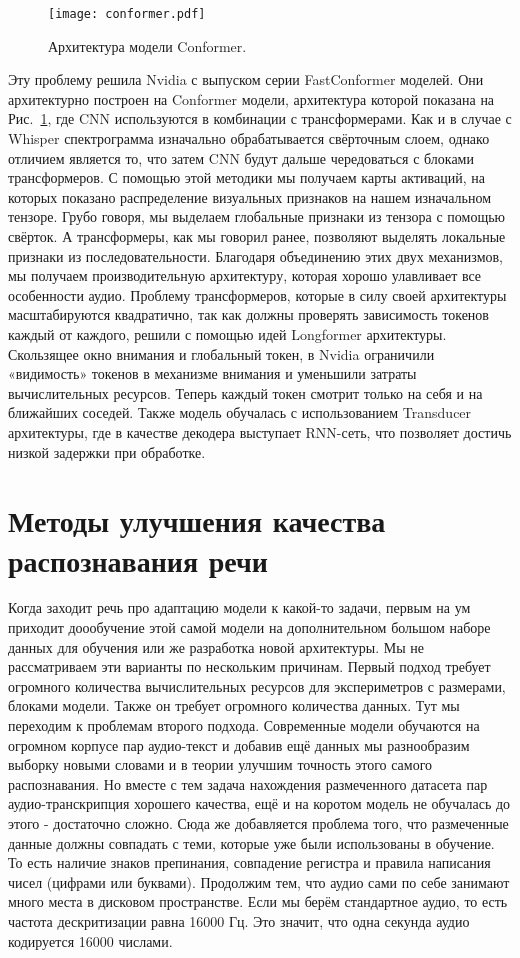 \begin{figure}[!t]
  \centering
  \texttt{[image: conformer.pdf]}
  \caption{Архитектура модели Conformer.}
  \label{fig:conformer}
\end{figure}

Эту проблему решила Nvidia с выпуском серии FastConformer моделей. 
Они архитектурно построен на Conformer модели, архитектура которой показана на Рис.~\ref{fig:conformer}, где CNN используются в комбинации с трансформерами.
Как и в случае с Whisper спектрограмма изначально обрабатывается свёрточным слоем, однако отличием является то, что затем CNN будут дальше чередоваться с блоками трансформеров.
С помощью этой методики мы получаем карты активаций, на которых показано распределение визуальных признаков на нашем изначальном тензоре.
Грубо говоря, мы выделаем глобальные признаки из тензора с помощью свёрток.
А трансформеры, как мы говорил ранее, позволяют выделять локальные признаки из последовательности.
Благодаря объединению этих двух механизмов, мы получаем производительную архитектуру, которая хорошо улавливает все особенности аудио.
Проблему трансформеров, которые в силу своей архитектуры масштабируются квадратично, так как должны проверять зависимость токенов каждый от каждого, решили с помощью идей Longformer архитектуры.
Скользящее окно внимания и глобальный токен, в Nvidia ограничили «видимость» токенов в механизме внимания и уменьшили затраты вычислительных ресурсов.
Теперь каждый токен смотрит только на себя и на ближайших соседей.
Также модель обучалась с использованием Transducer архитектуры, где в качестве декодера выступает RNN-сеть, что позволяет достичь низкой задержки при обработке.


\section{Методы улучшения качества распознавания речи}
Когда заходит речь про адаптацию модели к какой-то задачи, первым на ум приходит доообучение этой самой модели на дополнительном большом наборе данных для обучения или же разработка новой архитектуры.
Мы не рассматриваем эти варианты по нескольким причинам.
Первый подход требует огромного количества вычислительных ресурсов для экспериметров с размерами, блоками модели.
Также он требует огромного количества данных.
Тут мы переходим к проблемам второго подхода.
Современные модели обучаются на огромном корпусе пар аудио-текст и добавив ещё данных мы разнообразим выборку новыми словами и в теории улучшим точность этого самого распознавания.
Но вместе с тем задача нахождения размеченного датасета пар аудио-транскрипция хорошего качества, ещё и на коротом модель не обучалась до этого - достаточно сложно.
Сюда же добавляется проблема того, что размеченные данные должны совпадать с теми, которые уже были использованы в обучение.
То есть наличие знаков препинания, совпадение регистра и правила написания чисел (цифрами или буквами).
Продолжим тем, что аудио сами по себе занимают много места в дисковом пространстве.
Если мы берём стандартное аудио, то есть частота дескритизации равна 16000 Гц.
Это значит, что одна секунда аудио кодируется 16000 числами.

